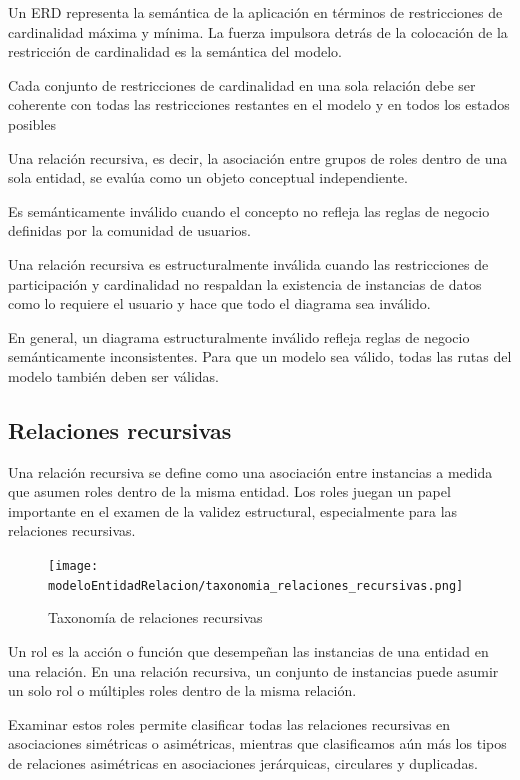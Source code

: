 Un ERD representa la semántica de la aplicación en términos de restricciones de cardinalidad máxima y mínima. La fuerza impulsora detrás de la colocación de la restricción de cardinalidad es la semántica del modelo.


Cada conjunto de restricciones de cardinalidad en una sola relación debe ser coherente con todas las restricciones restantes en el modelo y en todos los estados posibles


Una relación recursiva, es decir, la asociación entre grupos de roles dentro de una sola entidad, se evalúa como un objeto conceptual independiente. 


Es semánticamente inválido cuando el concepto no refleja las reglas de negocio definidas por la comunidad de usuarios. 


Una relación recursiva es estructuralmente inválida cuando las restricciones de participación y cardinalidad no respaldan la existencia de instancias de datos como lo requiere el usuario y hace que todo el diagrama sea inválido.


En general, un diagrama estructuralmente inválido refleja reglas de negocio semánticamente inconsistentes. Para que un modelo sea válido, todas las rutas del modelo también deben ser válidas.


\subsection*{Relaciones recursivas}

Una relación recursiva se define como una asociación entre instancias a medida que asumen roles dentro de la misma entidad. Los roles juegan un papel importante en el examen de la validez estructural, especialmente para las relaciones recursivas.

\begin{figure}[h!t] 
    \centering
    \texttt{[image: modeloEntidadRelacion/taxonomia\_relaciones\_recursivas.png]}
    \caption{Taxonomía de relaciones recursivas}
    \label{img:taxonomia_relaciones_recursivas}
\end{figure}

Un rol es la acción o función que desempeñan las instancias de una entidad en una relación.
En una relación recursiva, un conjunto de instancias puede asumir un solo rol o múltiples roles dentro de la misma relación. 


Examinar estos roles permite clasificar todas las relaciones recursivas en asociaciones simétricas o asimétricas, mientras que clasificamos aún más los tipos de relaciones asimétricas en asociaciones jerárquicas, circulares y duplicadas.



